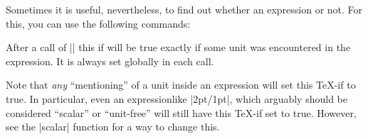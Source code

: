 Sometimes it is useful, nevertheless, to find out whether an expression or not.
For this, you can use the following commands:

{\let\ifpgfmathunitsdeclared\relax
  \begin{command}{\ifpgfmathunitsdeclared}
    After a call of |\pgfmathparse| this if will be true exactly if
    some unit was encountered in the expression. It is always set
    globally in each call.

    Note that \emph{any} ``mentioning'' of a unit inside an
    expression will set this \TeX-if to true. In particular, even an
    expressionlike |2pt/1pt|, which arguably should be considered
    ``scalar'' or ``unit-free'' will still have this \TeX-if set to
    true. However, see the |scalar| function for a way to change
    this.
  \end{command}
}

